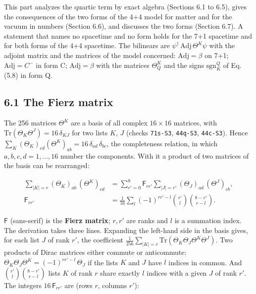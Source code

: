 \documentclass[
  10pt,
]{article}
\begin{document}
This part analyzes the quartic term by exact algebra (Sections 6.1 to
6.5), gives the consequences of the two forms of the 4+4 model for
matter and for the vacuum in numbers (Section 6.6), and discusses the
two forms (Section 6.7). A statement that names no spacetime and no form
holds for the 7+1 spacetime and for both forms of the 4+4 spacetime. The
bilinears are \(\psi^\dagger\,\mathrm{Adj}\,\Theta^K\psi\) with the
adjoint matrix and the matrices of the model concerned:
\(\mathrm{Adj}=\beta\) on 7+1; \(\mathrm{Adj}=C^-\) in form C;
\(\mathrm{Adj}=\beta\) with the matrices \(\Theta_Q^K\) and the signs
\(\mathrm{sgn}^Q_K\) of Eq. (5.8) in form Q.

\hypertarget{the-fierz-matrix}{%
\subsection{6.1 The Fierz matrix}\label{the-fierz-matrix}}

The 256 matrices \(\Theta^K\) are a basis of all complex \(16\times16\)
matrices, with \(\mathrm{Tr}(\Theta_K\Theta^J)=16\,\delta_{KJ}\) for two
lists \(K\), \(J\) (checks \texttt{71s-S3}, \texttt{44q-S3},
\texttt{44c-S3}). Hence
\(\sum_K(\Theta_K)_{cd}(\Theta^K)_{ab}=16\,\delta_{ad}\,\delta_{bc}\),
the completeness relation, in which \(a,b,c,d=1,\dots,16\) number the
components. With it a product of two matrices of the basis can be
rearranged:

\[\begin{aligned}
\sum_{|K|=r}(\Theta_K)_{ab}\,(\Theta^K)_{cd}
&=\sum_{r'=0}^{8}\mathsf F_{rr'}\sum_{|J|=r'}(\Theta_J)_{ad}\,(\Theta^J)_{cb},\\
\mathsf F_{rr'}&=\frac1{16}\sum_{l}(-1)^{rr'-l}\binom{r'}{l}\binom{8-r'}{r-l}.
\end{aligned}\tag{6.1}\]

\(\mathsf F\) (sans-serif) is the \textbf{Fierz matrix}; \(r,r'\) are
ranks and \(l\) is a summation index. The derivation takes three lines.
Expanding the left-hand side in the basis gives, for each list \(J\) of
rank \(r'\), the coefficient
\(\tfrac1{256}\sum_{|K|=r}\mathrm{Tr}(\Theta_K\Theta_J\Theta^K\Theta^J)\).
Two products of Dirac matrices either commute or anticommute:
\(\Theta_K\Theta_J\Theta^K=(-1)^{rr'-l}\,\Theta_J\) if the lists \(K\)
and \(J\) have \(l\) indices in common. And
\(\binom{r'}{l}\binom{8-r'}{r-l}\) lists \(K\) of rank \(r\) share
exactly \(l\) indices with a given \(J\) of rank \(r'\). The integers
\(16\,\mathsf F_{rr'}\) are (rows \(r\), columns \(r'\)):
\end{document}

